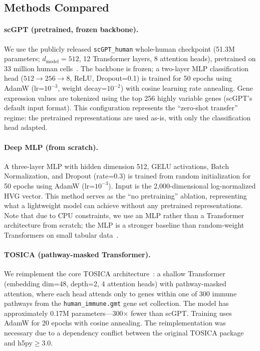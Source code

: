\documentclass{article}
\begin{document}
\subsection{Methods Compared}
\label{sec:methods_compared}

\paragraph{scGPT (pretrained, frozen backbone).}
We use the publicly released \texttt{scGPT\_human} whole-human checkpoint (51.3M
parameters; $d_\text{model}=512$, 12 Transformer layers, 8 attention heads), pretrained
on 33 million human cells~\citep{cui2024scgpt}. The backbone is frozen; a two-layer MLP
classification head ($512 \to 256 \to 8$, ReLU, Dropout=0.1) is trained for 50 epochs
using AdamW (lr=$10^{-3}$, weight decay=$10^{-2}$) with cosine learning rate annealing.
Gene expression values are tokenized using the top 256 highly variable genes (scGPT's
default input format). This configuration represents the ``zero-shot transfer'' regime:
the pretrained representations are used as-is, with only the classification head adapted.

\paragraph{Deep MLP (from scratch).}
A three-layer MLP with hidden dimension 512, GELU activations, Batch Normalization, and
Dropout (rate=0.3) is trained from random initialization for 50 epochs using AdamW
(lr=$10^{-3}$). Input is the 2,000-dimensional log-normalized HVG vector. This method
serves as the ``no pretraining'' ablation, representing what a lightweight model can
achieve without any pretrained representations. Note that due to CPU constraints, we use
an MLP rather than a Transformer architecture from scratch; the MLP is a stronger baseline
than random-weight Transformers on small tabular data~\citep{grinsztajn2022tree}.

\paragraph{TOSICA (pathway-masked Transformer).}
We reimplement the core TOSICA architecture~\citep{chen2023interpretable}: a shallow
Transformer (embedding dim=48, depth=2, 4 attention heads) with pathway-masked attention,
where each head attends only to genes within one of 300 immune pathways from the
\texttt{human\_immune.gmt} gene set collection. The model has approximately 0.17M
parameters---300$\times$ fewer than scGPT. Training uses AdamW for 20 epochs with
cosine annealing. The reimplementation was necessary due to a dependency conflict between
the original TOSICA package and h5py$\geq$3.0.
\end{document}
